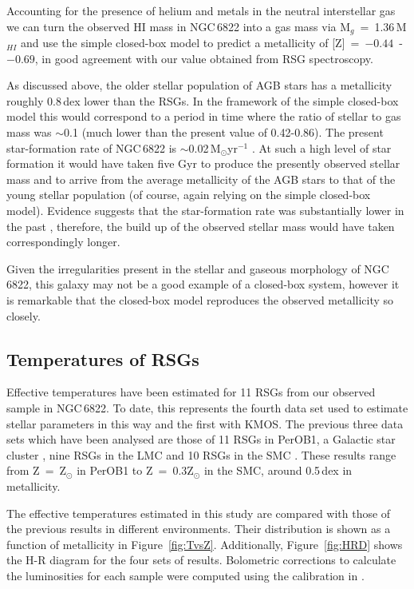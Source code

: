 Accounting for the presence of helium and metals in the neutral interstellar gas we can turn the observed HI mass in NGC\,6822 into a gas mass via
M$_{g}$~=~1.36\,M$_{HI}$ and use the simple closed-box model to predict a metallicity of
[Z]~=~$-0.44$~-~$-0.69$,
in good agreement with our value obtained from RSG spectroscopy.

As discussed above, the older stellar population of AGB stars has a metallicity roughly 0.8\,dex lower than the RSGs.
In the framework of the simple closed-box model this would correspond to a period in time where the ratio of stellar to gas mass was $\sim$0.1
(much lower than the present value of 0.42-0.86).
The present star-formation rate of NGC\,6822 is $\sim$0.02\,M$_{\odot}$yr$^{-1}$
\citep{2010A&A...512A..68G,2011ApJ...730...88E}.
At such a high level of star formation it would have taken five Gyr to produce the presently observed stellar mass and to arrive from the average metallicity of the AGB stars to that of the young stellar population
(of course, again relying on the simple closed-box model).
Evidence suggests that the star-formation rate was substantially lower in the past
\citep{2011ApJ...730...88E,2014ApJ...789..147W},
therefore, the build up of the observed stellar mass would have taken correspondingly longer.


Given the irregularities present in the stellar and gaseous morphology of NGC\,6822, this galaxy may not be a good example of a closed-box system, however it is remarkable that the closed-box model reproduces the observed metallicity so closely.


\subsection{Temperatures of RSGs} %
\label{sub:temperatures_of_rsgs}

Effective temperatures have been estimated for 11 RSGs from our observed sample in NGC\,6822.
To date, this represents the fourth data set used to estimate stellar parameters in this way and the first with KMOS.
The previous three data sets which have been analysed are those of 11 RSGs in PerOB1,
a Galactic star cluster
\citep{2014ApJ...788...58G}, nine RSGs in the LMC and 10 RSGs in the SMC
\citep[both from][]{2015ApJ...806...21D}.
These results range from Z~=~Z$_{\odot}$ in PerOB1 to Z~=~0.3Z$_{\odot}$ in the SMC, around 0.5\,dex in metallicity.

The effective temperatures estimated in this study are compared with those of the previous results in different environments.
Their distribution is shown as a function of metallicity in Figure~\ref{fig:TvsZ}.
Additionally, Figure~\ref{fig:HRD} shows the H-R diagram for the four sets of results.
Bolometric corrections to calculate the luminosities for each sample were computed using the calibration in
\cite{2013ApJ...767....3D}.


